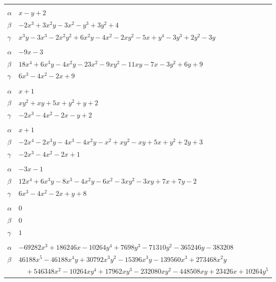 \documentclass[11pt]{article}
\begin{document}
\begin{longtable}{@{}ll@{}}
\addlinespace[3pt]
\multicolumn{2}{@{}l}{$\{i,j\}=\{6,102\}$, $k_{ij}=2$}\\
$\alpha$ & $x-y+2$\\
$\beta$ & $-2x^{3}+3x^{2}y-3x^{2}-y^{3}+3y^{2}+4$\\
$\gamma$ & $x^{3}y-3x^{3}-2x^{2}y^{2}+6x^{2}y-4x^{2}-2xy^{2}-5x+y^{4}-3y^{3}+2y^{2}-3y$\\
\addlinespace[3pt]
\multicolumn{2}{@{}l}{$\{i,j\}=\{7,8\}$, $k_{ij}=3\cdot 7$}\\
$\alpha$ & $-9x-3$\\
$\beta$ & $18x^{4}+6x^{3}y-4x^{2}y-23x^{2}-9xy^{2}-11xy-7x-3y^{2}+6y+9$\\
$\gamma$ & $6x^{3}-4x^{2}-2x+9$\\
\addlinespace[3pt]
\multicolumn{2}{@{}l}{$\{i,j\}=\{7,9\}$, $k_{ij}=3$}\\
$\alpha$ & $x+1$\\
$\beta$ & $xy^{2}+xy+5x+y^{2}+y+2$\\
$\gamma$ & $-2x^{3}-4x^{2}-2x-y+2$\\
\addlinespace[3pt]
\multicolumn{2}{@{}l}{$\{i,j\}=\{7,10\}$, $k_{ij}=3$}\\
$\alpha$ & $x+1$\\
$\beta$ & $-2x^{4}-2x^{3}y-4x^{3}-4x^{2}y-x^{2}+xy^{2}-xy+5x+y^{2}+2y+3$\\
$\gamma$ & $-2x^{3}-4x^{2}-2x+1$\\
\addlinespace[3pt]
\multicolumn{2}{@{}l}{$\{i,j\}=\{7,11\}$, $k_{ij}=7$}\\
$\alpha$ & $-3x-1$\\
$\beta$ & $12x^{4}+6x^{3}y-8x^{3}-4x^{2}y-6x^{2}-3xy^{2}-3xy+7x+7y-2$\\
$\gamma$ & $6x^{3}-4x^{2}-2x+y+8$\\
\addlinespace[3pt]
\multicolumn{2}{@{}l}{$\{i,j\}=\{7,86\}$, $k_{ij}=3$}\\
$\alpha$ & $0$\\
$\beta$ & $0$\\
$\gamma$ & $1$\\
\addlinespace[3pt]
\multicolumn{2}{@{}l}{$\{i,j\}=\{8,15\}$, $k_{ij}=2^{4}\cdot 3^{2}\cdot 5^{2}\cdot 13^{2}$}\\
$\alpha$ & $-69282x^{3}+186246x-10264y^{4}+7698y^{3}-71310y^{2}-365246y-383208$\\
$\beta$ & $46188x^{5}-46188x^{4}y+30792x^{3}y^{2}-15396x^{3}y-139560x^{3}+273468x^{2}y$\\
 & $\quad +546348x^{2}-10264xy^{4}+17962xy^{3}-232080xy^{2}-448508xy+23426x+10264y^{5}$\\

\end{longtable}
\end{document}

